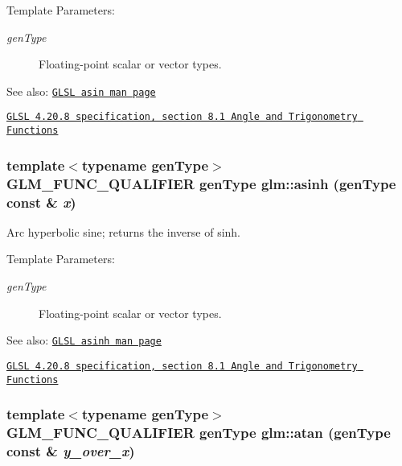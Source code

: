 \begin{Desc}
\item[Template Parameters:]
\begin{description}
\item[{\em genType}]Floating-point scalar or vector types.\end{description}
\end{Desc}
\begin{Desc}
\item[See also:]\href{http://www.opengl.org/sdk/docs/manglsl/xhtml/asin.xml}{\tt GLSL asin man page} 

\href{http://www.opengl.org/registry/doc/GLSLangSpec.4.20.8.pdf}{\tt GLSL 4.20.8 specification, section 8.1 Angle and Trigonometry Functions} \end{Desc}
\hypertarget{group__core__func__trigonometric_gaedecffe9a7c10e5930c4ec938a0ca2e}{
\subsubsection[asinh]{\setlength{\rightskip}{0pt plus 5cm}template$<$typename genType$>$ GLM\_\-FUNC\_\-QUALIFIER genType glm::asinh (genType const \& {\em x})}}
\label{group__core__func__trigonometric_gaedecffe9a7c10e5930c4ec938a0ca2e}


Arc hyperbolic sine; returns the inverse of sinh.

\begin{Desc}
\item[Template Parameters:]
\begin{description}
\item[{\em genType}]Floating-point scalar or vector types.\end{description}
\end{Desc}
\begin{Desc}
\item[See also:]\href{http://www.opengl.org/sdk/docs/manglsl/xhtml/asinh.xml}{\tt GLSL asinh man page} 

\href{http://www.opengl.org/registry/doc/GLSLangSpec.4.20.8.pdf}{\tt GLSL 4.20.8 specification, section 8.1 Angle and Trigonometry Functions} \end{Desc}
\hypertarget{group__core__func__trigonometric_g459eaa7149e799125acda24938114746}{
\subsubsection[atan]{\setlength{\rightskip}{0pt plus 5cm}template$<$typename genType$>$ GLM\_\-FUNC\_\-QUALIFIER genType glm::atan (genType const \& {\em y\_\-over\_\-x})}}
\label{group__core__func__trigonometric_g459eaa7149e799125acda24938114746}


